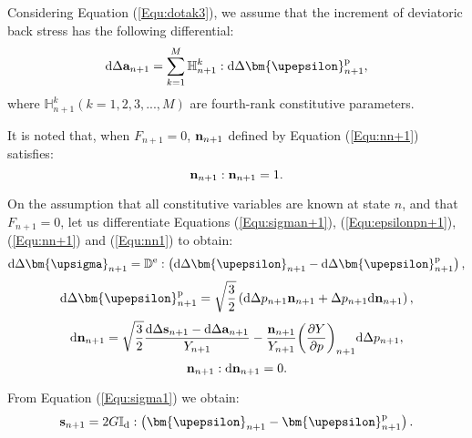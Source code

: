 Considering Equation (\ref{Equ:dotak3}), we assume that the increment of deviatoric back stress has the following differential:
\begin{equation}
\label{Equ:dan+1}
{\text{d}}\Delta {{\bf{a}}_{n + 1}} = \sum\limits_{k = 1}^M {\mathbb{H}_{n + 1}^k} :{\text{d}}\Delta {\bm{\upepsilon }}_{n + 1}^{\rm{p}},
\end{equation}
where $\mathbb{H}_{n + 1}^k( k = 1,2,3,...,M )$ are fourth-rank constitutive parameters.

It is noted that, when ${F_{n + 1}} = 0$, ${\bf{n}}_{n + 1}$ defined by Equation (\ref{Equ:nn+1}) satisfies:
\begin{equation}
\label{Equ:nn1}
{{\bf{n}}_{n + 1}}:{{\bf{n}}_{n + 1}} = 1.
\end{equation}

On the assumption that all constitutive variables are known at state $n$, and that $F_{n+1}=0$, let us differentiate Equations (\ref{Equ:sigman+1}), (\ref{Equ:epsilonpn+1}), (\ref{Equ:nn+1}) and (\ref{Equ:nn1}) to obtain:
\begin{equation}
\label{Equ:dsigman+1}
{\text{d}}\Delta {{\bm{\upsigma }}_{n + 1}} = {\mathbb{D}^{\rm{e}}}:\left( {{\text{d}}\Delta {{\bm{\upepsilon }}_{n + 1}} - {\text{d}}\Delta {\bm{\upepsilon }}_{n + 1}^{\rm{p}}} \right),
\end{equation}
\begin{equation}
\label{Equ:depsilon+1}
{\text{d}}\Delta {\bm{\upepsilon }}_{n + 1}^{\rm{p}} = \sqrt {\frac{3}{2}} \left( {{\text{d}}\Delta {p_{n + 1}}{{\bf{n}}_{n + 1}} + \Delta {p_{n + 1}}{\text{d}}{{\bf{n}}_{n + 1}}} \right),
\end{equation}
\begin{equation}
\label{Equ:dnn+1}
{\text{d}}{{\bf{n}}_{n + 1}} = \sqrt {\frac{3}{2}} \frac{{{\text{d}}\Delta {{\bf{s}}_{n + 1}} - {\text{d}}\Delta {{\bf{a}}_{n + 1}}}}{{{Y_{n + 1}}}} - \frac{{{{\bf{n}}_{n + 1}}}}{{{Y_{n + 1}}}}{\left( {\frac{{\partial Y}}{{\partial p}}} \right)_{n + 1}}{\text{d}}\Delta {p_{n + 1}},
\end{equation}
\begin{equation}
{{\bf{n}}_{n + 1}}:{\text{d}}{{\bf{n}}_{n + 1}} = 0.
\end{equation}

From Equation (\ref{Equ:sigma1}) we obtain:
\begin{equation}
\label{Equ:sn+1}
{{\bf{s}}_{n + 1}} = 2G{\mathbb{I}_{\rm{d}}}:\left( {{{\bm{\upepsilon }}_{n + 1}} - {\bm{\upepsilon }}_{n + 1}^{\rm{p}}} \right).
\end{equation}

